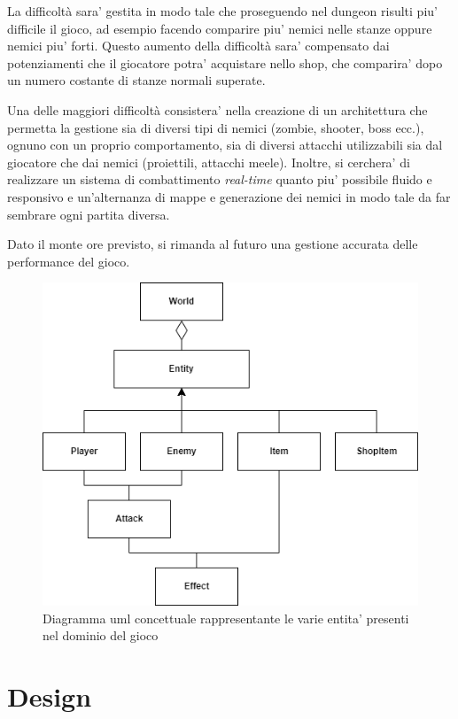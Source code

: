 \documentclass[a4paper,12pt]{report}
\begin{document}
La difficoltà sara' gestita in modo tale che proseguendo nel dungeon risulti piu' difficile il gioco, ad esempio facendo comparire piu' nemici nelle stanze oppure nemici piu' forti. Questo aumento della difficoltà sara' compensato dai potenziamenti che il giocatore potra' acquistare nello shop, che comparira' dopo un numero costante di stanze normali superate. 

Una delle maggiori difficoltà consistera' nella creazione di un architettura che permetta la gestione sia di diversi tipi di nemici (zombie, shooter, boss ecc.), ognuno con un proprio comportamento, sia di diversi attacchi utilizzabili sia dal giocatore che dai nemici (proiettili, attacchi meele). Inoltre, si cerchera' di realizzare un sistema di combattimento \textit{real-time} quanto piu' possibile fluido e responsivo e un'alternanza di mappe e generazione dei nemici in modo tale da far sembrare ogni partita diversa.

Dato il monte ore previsto, si rimanda al futuro una gestione accurata delle performance del gioco.

\begin{figure}[h]
	\centering{}
	\includegraphics[width=\textwidth]{uml/img/uml_analisi_dominio.png}
	\caption{Diagramma uml concettuale rappresentante le varie entita' presenti nel dominio del gioco}
\end{figure}


\chapter{Design}
\end{document}

